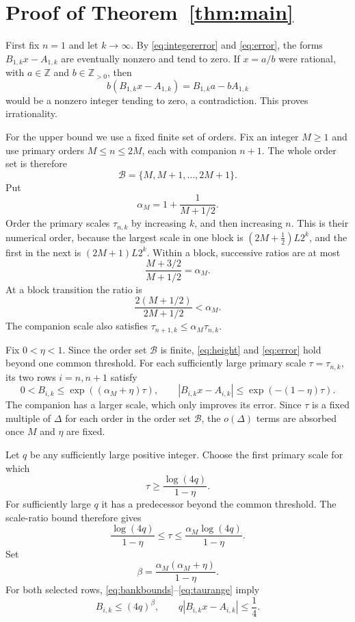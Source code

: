 \documentclass{amsart}
\numberwithin{equation}{section}
\newcommand{\Z}{\mathbb Z}
\begin{document}
\section{Proof of Theorem~\ref{thm:main}}

First fix $n=1$ and let $k\to\infty$.
By \eqref{eq:integererror} and \eqref{eq:error}, the forms
$B_{1,k}x-A_{1,k}$ are eventually nonzero and tend to zero.
If $x=a/b$ were rational, with $a\in\Z$ and $b\in\Z_{>0}$, then
\[
b(B_{1,k}x-A_{1,k})=B_{1,k}a-bA_{1,k}
\]
would be a nonzero integer tending to zero, a contradiction.
This proves irrationality.

For the upper bound we use a fixed finite set of orders.
Fix an integer $M\ge1$ and use primary orders $M\le n\le2M$,
each with companion $n+1$. The whole order set is therefore
\begin{equation}\label{eq:bank}
\mathcal B=\{M,M+1,\ldots,2M+1\}.
\end{equation}
Put
\begin{equation}\label{eq:alpha}
\alpha_M=1+\frac1{M+1/2}.
\end{equation}
Order the primary scales $\tau_{n,k}$ by increasing $k$, and then
increasing $n$. This is their numerical order, because the largest
scale in one block is $(2M+\tfrac12)L2^k$, and the first in the
next is $(2M+1)L2^k$. Within a block, successive ratios are at most
\[
\frac{M+3/2}{M+1/2}=\alpha_M.
\]
At a block transition the ratio is
\[
\frac{2(M+1/2)}{2M+1/2}<\alpha_M.
\]
The companion scale also satisfies
$\tau_{n+1,k}\le\alpha_M\tau_{n,k}$.

Fix $0<\eta<1$. Since the order set $\mathcal B$ is finite, \eqref{eq:height} and
\eqref{eq:error} hold beyond one common threshold. For each
sufficiently large primary scale $\tau=\tau_{n,k}$, its two rows
$i=n,n+1$ satisfy
\begin{equation}\label{eq:bankbounds}
0<B_{i,k}\le\exp((\alpha_M+\eta)\tau),\qquad
|B_{i,k}x-A_{i,k}|\le\exp(-(1-\eta)\tau).
\end{equation}
The companion has a larger scale, which only improves its error.
Since $\tau$ is a fixed multiple of $\Delta$ for each order in the
order set $\mathcal B$, the $o(\Delta)$ terms are absorbed once $M$ and $\eta$ are fixed.

Let $q$ be any sufficiently large positive integer. Choose the first
primary scale for which
\begin{equation}\label{eq:selection}
\tau\ge\frac{\log(4q)}{1-\eta}.
\end{equation}
For sufficiently large $q$ it has a predecessor beyond the common
threshold. The scale-ratio bound therefore gives
\begin{equation}\label{eq:taurange}
\frac{\log(4q)}{1-\eta}\le\tau
 \le\frac{\alpha_M\log(4q)}{1-\eta}.
\end{equation}
Set
\begin{equation}\label{eq:beta}
\beta=\frac{\alpha_M(\alpha_M+\eta)}{1-\eta}.
\end{equation}
For both selected rows, \eqref{eq:bankbounds}--\eqref{eq:taurange}
imply
\begin{equation}\label{eq:qbounds}
B_{i,k}\le(4q)^\beta,\qquad
q|B_{i,k}x-A_{i,k}|\le\frac14.
\end{equation}
\end{document}
